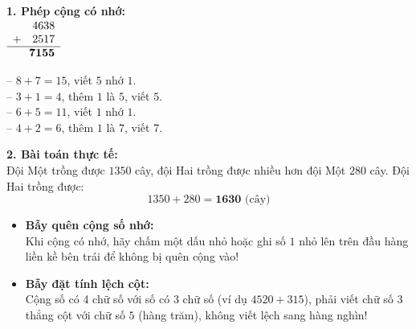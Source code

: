 \documentclass[11pt,a4paper]{article}
\begin{document}
\vspace{-2.5mm}
\noindent
\begin{minipage}[t]{0.49\textwidth}\vspace{0pt}
\begin{tcolorbox}[
  enhanced,
  colback=green!4!white,
  colframe=green!60!black,
  arc=2mm, boxrule=0.8pt,
  left=2mm, right=2mm, top=1.8mm, bottom=1.8mm,
  title={\footnotesize\bfseries\color{white}\faCheckCircle\ Ví dụ thực hành chuẩn mực}
]
{\footnotesize
\textbf{1. Phép cộng có nhớ:}\\
$\begin{array}{r@{}l}
  4638 & \\
  +\quad 2517 & \\
  \hline
  \mathbf{7155} &
\end{array}$
\qquad
\begin{minipage}[c]{0.5\linewidth}
-- $8 + 7 = 15$, viết $5$ nhớ $1$.\\
-- $3 + 1 = 4$, thêm $1$ là $5$, viết $5$.\\
-- $6 + 5 = 11$, viết $1$ nhớ $1$.\\
-- $4 + 2 = 6$, thêm $1$ là $7$, viết $7$.
\end{minipage}

\textbf{2. Bài toán thực tế:}\\
Đội Một trồng được $1350$ cây, đội Hai trồng được nhiều hơn đội Một $280$ cây. Đội Hai trồng được:
$$1350 + 280 = \mathbf{1630}\text{ (cây)}$$
}
\end{tcolorbox}
\end{minipage}
\hfill
\begin{minipage}[t]{0.49\textwidth}\vspace{0pt}
\begin{tcolorbox}[
  enhanced,
  colback=red!4!white,
  colframe=red!70!black,
  arc=2mm, boxrule=0.8pt,
  left=2mm, right=2mm, top=1.8mm, bottom=1.8mm,
  title={\footnotesize\bfseries\color{white}\faExclamationTriangle\ Mẹo tránh bẫy trắc nghiệm}
]
{\footnotesize
\begin{itemize}\setlength{\itemsep}{1.5pt}\setlength{\leftskip}{-2.5mm}
  \item \textbf{Bẫy quên cộng số nhớ:}\\
  Khi cộng có nhớ, hãy chấm một dấu nhỏ hoặc ghi số $1$ nhỏ lên trên đầu hàng liền kề bên trái để không bị quên cộng vào!
  \item \textbf{Bẫy đặt tính lệch cột:}\\
  Cộng số có 4 chữ số với số có 3 chữ số (ví dụ $4520 + 315$), phải viết chữ số $3$ thẳng cột với chữ số $5$ (hàng trăm), không viết lệch sang hàng nghìn!
\end{itemize}
}
\end{tcolorbox}
\end{minipage}
\end{document}
